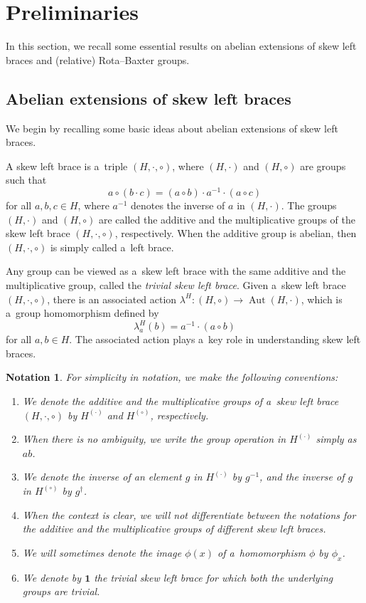 \documentclass{jonasart}
\theoremstyle{plain}
\newtheorem*{notation}{Notation}
\DeclareMathOperator{\Aut}{Aut}
\begin{document}
	\section{Preliminaries}\label{section prelim}
	In this section, we recall some essential results on abelian extensions of skew left braces and (relative) Rota--Baxter groups.
	
	\subsection{Abelian extensions of skew left braces}
	We begin by recalling some basic ideas about abelian extensions of skew left braces.
	
	\begin{definition}
		A skew left brace is a~triple $(H,\cdot,\circ)$, where $(H,\cdot)$ and $(H, \circ)$ are groups such that
		\[
		a \circ (b \cdot c)=(a\circ b) \cdot a^{-1} \cdot (a \circ c)
		\]
		for all $a,b,c \in H$, where $a^{-1}$ denotes the inverse of $a$ in $(H, \cdot)$. The groups $(H,\cdot)$ and $(H, \circ)$ are called the additive and the multiplicative groups of the skew left brace $(H, \cdot, \circ)$, respectively. When the additive group is abelian, then $(H,\cdot,\circ)$ is simply called a~left brace.
	\end{definition}
	
	Any group can be viewed as a~skew left brace with the same additive and the multiplicative group, called the \textit{trivial skew left brace}. Given a~skew left brace $(H,\cdot,\circ)$, there is an associated action $\lambda^H:(H,\circ)\rightarrow \Aut(H,\cdot)$, which is a~group homomorphism defined by
	\[
	\lambda^H_a(b)=a^{-1}\cdot(a\circ b)
	\]
	for all $a, b \in H$. The associated action plays a~key role in understanding skew left braces.
	\begin{notation}
		For simplicity in notation, we make the following conventions:
		\begin{enumerate}
			\item We denote the additive and the multiplicative groups of a~skew left brace $(H, \cdot, \circ)$ by $H ^{(\cdot)}$ and $H ^{(\circ)}$, respectively.
			\item When there is no ambiguity, we write the group operation in $H ^{(\cdot)}$ simply as $ab$.
			\item We denote the inverse of an element $g$ in $H ^{(\cdot)}$ by $g^{-1}$, and the inverse of $g$ in $H ^{(\circ)}$ by $g^\dagger$.
			\item When the context is clear, we will not differentiate between the notations for the additive and the multiplicative groups of different skew left braces.
			\item We will sometimes denote the image $\phi(x)$ of a~homomorphism $\phi$ by $\phi_x$.
			\item We denote by $\textbf{1}$ the trivial skew left brace for which both the underlying groups are trivial.
		\end{enumerate}
	\end{notation}
	
\end{document}
